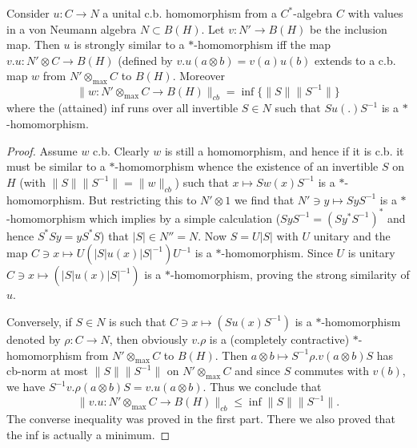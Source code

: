 \documentclass[10pt,a4paper]{amsart}
\begin{document}
        \begin{pro} \label{p1}
        Consider $u: C \to N  $ a unital  c.b.  homomorphism from a $C^*$-algebra $C$
        with values in a von Neumann algebra  $N\subset B(H)$.
        Let $v: N' \to B(H)$ be the inclusion map.
        Then $u$ is strongly similar to a $*$-homomorphism
        iff the map $v . u : N' \otimes  C\to B(H) $ (defined by
        $v . u (a\otimes b)= v(a)u(b) $ extends to
        a c.b. map $w$ from $N' \otimes_{\max} C$ to $B(H)$.
        Moreover
         \begin{equation}  \label{e9}
         \| w:  N'\otimes_{\max} C \to B(H)\|_{cb} =\inf\{\|S\|\| S^{-1}  \| \}\end{equation}
        where the (attained) inf runs over all invertible  $S\in N$
        such that  $S u(.) S^{-1}$ is   a $*$-homomorphism.
\end{pro}

          \begin{proof}  Assume $w$ c.b. Clearly $w$ is still a homomorphism,
          and hence if it is c.b. it must be similar to a $*$-homomorphism
          whence the existence of an invertible $S$ on $H$ (with
          $\|S\|\| S^{-1}  \| =\|w\|_{cb} $)
          such that $x\mapsto S w(x) S^{-1} $ is a $*$-homomorphism.
          But restricting this to $N' \otimes 1$ we find that 
          $N' \ni y \mapsto  S y S^{-1}$ is  a $*$-homomorphism
          which implies by a simple calculation 
          ($S y S^{-1}   = (S y^* S^{-1})^* $ and hence $S^*S y=yS^*S$)
          that $|S| \in N''=N$.
          Now $S=U|S|$ with $U$ unitary and the map
          $C\ni x \mapsto  U (|S| u(x) |S|^{-1}) U^{-1}$
          is  a $*$-homomorphism.
          Since $U$ is unitary $C\ni x \mapsto    (|S| u(x) |S|^{-1})  $
           is  a $*$-homomorphism, proving the strong similarity of $u$.
           
           Conversely, if $S\in N$ is such that $C\ni x \mapsto    (S u(x) S^{-1})  $
           is  a $*$-homomorphism denoted by $\rho: C \to N$,
           then obviously $v.\rho $ is a (completely contractive)  
           $*$-homomorphism from $ N'\otimes_{\max} C$ to $B(H)$.
           Then  $a\otimes b \mapsto S^{-1} \rho.v (a\otimes b)   S $
           has cb-norm at most $\|S\|  \| S^{-1}  \|$ on $ N'\otimes_{\max} C$ and since $S$ commutes with $v(b)$, we have
           $S^{-1} v.\rho (a\otimes b)   S = v.u(a\otimes b) $. Thus we 
           conclude that $$\| v.u: N'  \otimes_{\max} C\to B(H)\|_{cb} \le \inf\|S\|  \| S^{-1}  \|.$$
           The converse inequality was proved in the first part. There we also proved that the inf is actually a minimum.
    \end{proof}
\end{document}
